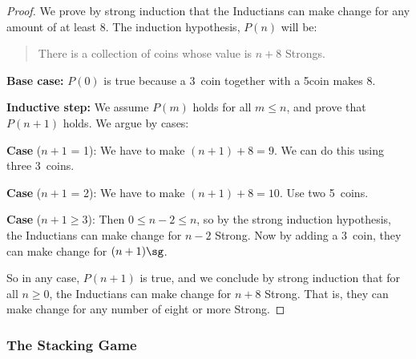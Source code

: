 \begin{proof}

  We prove by strong induction that the Inductians can make change for any
  amount of at least 8\sg.  The induction hypothesis, $P(n)$ will be:
\begin{quote}
There is a collection of coins whose value is $n+8$ Strongs.
\end{quote}

\iffalse
\begin{editingnotes}
Notice that $P(n)$ is an implication.  When the hypothesis of an
implication is false, we know the whole implication is true.  In this
situation, the implication is said to be \emph{vacuously} true.  So $P(n)$
will be vacuously true whenever $n < 8$.
\iffalse
\footnote{Another approach that
avoids these vacuous cases is to define
\[
Q(n) \eqdef \text{there is a collection of coins whose value is $n+8\sg$},
\]
and prove that $Q(n)$ holds for all $n \geq 0$.
\iffalse
The solution to
\href{http://courses.csail.mit.edu/6.042/spring06/solutions/cp3fsol.pdf}
{Class Problem 1 from Spring '06, Friday, Feb. 24} uses this approach.\fi
}\fi

We now proceed with the induction proof:
\end{editingnotes}\fi

\textbf{Base case:} $P(0)$ is true because a 3\sg\ coin together with
a 5\sg coin makes 8\sg.

\textbf{Inductive step:}  We assume $P(m)$ holds for all $m \leq n$, and
prove that $P(n+1)$ holds.  We argue by cases:

\textbf{Case} ($n+1$ = 1): We have to make $(n+1) +8 =9$\sg.  We can do this using three 3\sg\ coins.

\textbf{Case} ($n+1$ = 2): We have to make $(n+1) +8 =10$\sg.  Use two
5\sg\ coins.

\textbf{Case} ($n+1 \geq 3$): Then $0 \leq n - 2 \leq n$, so by the
strong induction hypothesis, the Inductians can make change for $n-2$
Strong.  Now by adding a 3\sg\ coin, they can make change for
$(n+1)\sg$.

So in any case, $P(n+1)$ is true, and we conclude by strong induction
that for all $n \ge 0$, the Inductians can make change for $n+8$
Strong.  That is, they can make change for any number of eight or more
Strong.

\end{proof}

\subsubsection{The Stacking Game}

